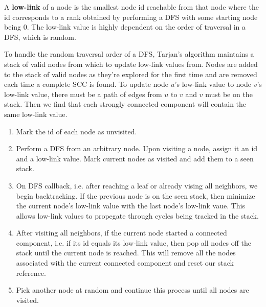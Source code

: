 \documentclass{article}
\begin{document}
    A \textbf{low-link} of a node is the smallest node id reachable from that node where the id corresponds to a rank obtained by performing a DFS with some starting node being 0. The low-link value is highly dependent on the order of traversal in a DFS, which is random.
    
    To handle the random traversal order of a DFS, Tarjan's algorithm maintains a stack of valid nodes from which to update low-link values from. Nodes are added to the stack of valid nodes as they're explored for the first time and are removed each time a complete SCC is found. To update node $u$'s low-link value to node $v$'s low-link value, there must be a path of edges from $u$ to $v$ and $v$ must be on the stack. Then we find that each strongly connected component will contain the same low-link value. 
    
    \begin{enumerate}
        \item Mark the id of each node as unvisited.
        \item Perform a DFS from an arbitrary node. Upon visiting a node, assign it an id and a low-link value. Mark current nodes as visited and add them to a seen stack.
        \item On DFS callback, i.e. after reaching a leaf or already vising all neighbors, we begin backtracking. If the previous node is on the seen stack, then minimize the current node's low-link value with the last node's low-link vaue. This allows low-link values to propegate through cycles being tracked in the stack.
        \item After visiting all neighbors, if the current node started a connected component, i.e. if its id equals its low-link value, then pop all nodes off the stack until the current node is reached. This will remove all the nodes associated with the current connected component and reset our stack reference.
        \item Pick another node at random and continue this process until all nodes are visited.
    \end{enumerate}
\end{document}
